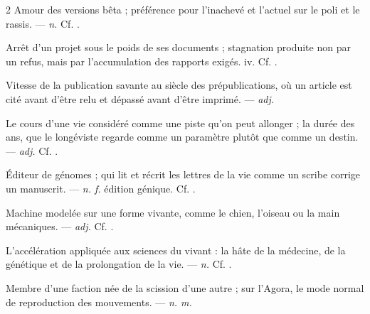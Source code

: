 \begin{multicols}{2}
 Amour des versions bêta ; préférence pour l'inachevé et l'actuel sur le poli et le rassis.  —  \textit{n.} Cf. .

 Arrêt d'un projet sous le poids de ses documents ; stagnation produite non par un refus, mais par l'accumulation des rapports exigés.   iv. Cf. .

 Vitesse de la publication savante au siècle des prépublications, où un article est cité avant d'être relu et dépassé avant d'être imprimé. —  \textit{adj.}

 Le cours d'une vie considéré comme une piste qu'on peut allonger ; la durée des ans, que le longéviste regarde comme un paramètre plutôt que comme un destin. —  \textit{adj.} Cf. .

 Éditeur de génomes ; qui lit et récrit les lettres de la vie comme un scribe corrige un manuscrit.  —  \textit{n. f.} édition génique. Cf. .

 Machine modelée sur une forme vivante, comme le chien, l'oiseau ou la main mécaniques. —  \textit{adj.} Cf. .

 L'accélération appliquée aux sciences du vivant : la hâte de la médecine, de la génétique et de la prolongation de la vie.  —  \textit{n.} Cf. .

 Membre d'une faction née de la scission d'une autre ; sur l'Agora, le mode normal de reproduction des mouvements.   —  \textit{n. m.}


\end{multicols}
